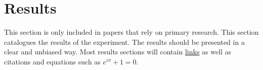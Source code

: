 \section{Results}

This section is only included in papers that rely on primary research. This section catalogues the results of the experiment. The results should be presented in a clear and unbiased way. Most results sections will contain \href{http://authorea.com}{links} as well as citations \cite{Einstein_2006} and equations such as $e^{i\pi}+1=0$.